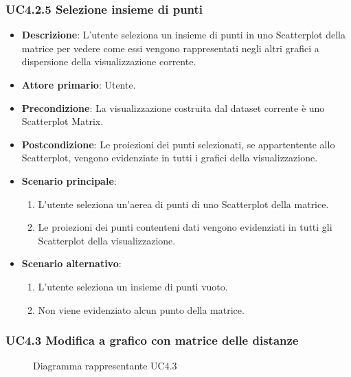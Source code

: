 \subsubsection{UC4.2.5 Selezione insieme di punti}
\label{ssub:uc4.2.5}
\begin{itemize}
    \item \textbf{Descrizione}: L'utente seleziona un insieme di punti in uno Scatterplot della matrice per vedere come 
                                essi vengono rappresentati negli altri grafici a dispersione della visualizzazione corrente.
	
    \item \textbf{Attore primario}: Utente.
    
    \item \textbf{Precondizione}:   La visualizzazione costruita dal dataset corrente è uno Scatterplot Matrix.
    \item \textbf{Postcondizione}:  Le proiezioni dei punti selezionati, se appartentente allo Scatterplot, 
                                    vengono evidenziate in tutti i grafici della visualizzazione.

	\item \textbf{Scenario principale}:
        \begin{enumerate}
            \item L'utente seleziona un'aerea di punti di uno Scatterplot della matrice.
            \item Le proiezioni dei punti contenteni dati vengono evidenziati in tutti gli Scatterplot della visualizzazione.
        \end{enumerate}

    \item \textbf{Scenario alternativo}:
        \begin{enumerate}
            \item L'utente seleziona un insieme di punti vuoto.
            \item Non viene evidenziato alcun punto della matrice.
        \end{enumerate}

\end{itemize}

\newpage
\subsubsection{UC4.3 Modifica a grafico con matrice delle distanze}
\label{ssub:uc4.3}

\begin{figure}[h]
    \centering
    \caption{Diagramma rappresentante UC4.3}
    \label{fig:UC4.3}
\end{figure}

